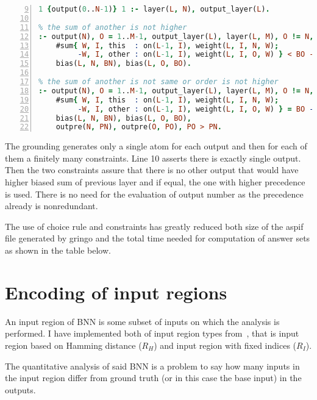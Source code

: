 \documentclass{fithesis}
\begin{document}
\begin{lstlisting}[language=prolog, numbers=left, countblanklines=false, firstnumber=9]
% there is single output
1 {output(0..N-1)} 1 :- layer(L, N), output_layer(L).

% the sum of another is not higher
:- output(N), O = 1..M-1, output_layer(L), layer(L, M), O != N,
    #sum{ W, I, this  : on(L-1, I), weight(L, I, N, W);
         -W, I, other : on(L-1, I), weight(L, I, O, W) } < BO - BN,
    bias(L, N, BN), bias(L, O, BO).

% the sum of another is not same or order is not higher
:- output(N), O = 1..M-1, output_layer(L), layer(L, M), O != N,
    #sum{ W, I, this  : on(L-1, I), weight(L, I, N, W);
         -W, I, other : on(L-1, I), weight(L, I, O, W) } = BO - BN,
    bias(L, N, BN), bias(L, O, BO),
    outpre(N, PN), outpre(O, PO), PO > PN.
\end{lstlisting}

The grounding generates only a single atom for each output and then for each
of them a finitely many constraints. Line 10 asserts there is exactly single
output. Then the two constraints assure that there is no other output
that would have higher biased sum of previous layer and if equal, the one with
higher precedence is used. There is no need for the evaluation of output number
as the precedence already is nonredundant.

The use of choice rule and constraints has greatly reduced both size of
the aspif file generated by gringo and the total time needed for computation
of answer sets as shown in the table below.


\section{Encoding of input regions}\label{section:inputregion}

An input region of BNN is some subset of inputs on which the analysis is
performed. I have implemented both of input region types from~\cite{10.1145/3563212},
that is input region based on Hamming distance ($R_H$) and input region with
fixed indices ($R_I$).

The quantitative analysis of said BNN is a problem to say how many inputs
in the input region differ from ground truth (or in this case the base input)
in the outputs.
\end{document}
